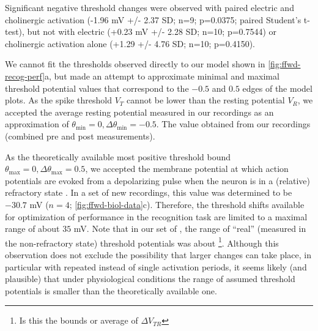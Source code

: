 
Significant negative threshold changes were observed with paired electric and cholinergic activation (-1.96 mV +/- 2.37 SD; n=9; p=0.0375; paired Student's t-test), but not with electric (+0.23 mV +/- 2.28 SD; n=10; p=0.7544) or cholinergic activation alone (+1.29 +/- 4.76 SD; n=10; p=0.4150).

We cannot fit the thresholds observed directly to our model shown in \autoref{fig:ffwd-recog-perf}a,
        but made an attempt to approximate minimal and maximal threshold potential values
        that correspond to the $-0.5$ and $0.5$ edges of the model plots.
    As the spike threshold $V_T$ cannot be lower than the resting potential $V_R$,
        we accepted the average resting potential measured in our recordings
        as an approximation of
        $\theta_{\mathrm{min}} = 0, \Delta \theta_{\mathrm{min}} = -0.5$.
    The value obtained from our recordings
        (combined pre and post measurements).

As the theoretically available most positive threshold bound
        $\theta_{\mathrm{max}} = 0, \Delta \theta_{\mathrm{max}} = 0.5$,
        we accepted the membrane potential at which action potentials are evoked
            from a depolarizing pulse when the neuron is in a (relative) refractory state
        .
    In a set of new recordings, this value was determined to be $-30.7$ mV
        ($n=4$; \autoref{fig:ffwd-biol-data}c).
    Therefore, the threshold shifts available for optimization of performance in the recognition task
        are limited to a maximal range of about $35$ mV.
    Note that in our set of
        ,
        the range of ``real'' (measured in the non-refractory state) threshold potentials
        was about
        \footnote{Is this the bounds or average of $\Delta V_{TR}$}.
    Although this observation does not exclude the possibility that larger changes can take place,
        in particular with repeated instead of single activation periods,
        it seems likely (and plausible) that under physiological conditions
            the range of assumed threshold potentials
            is smaller than the theoretically available one.

